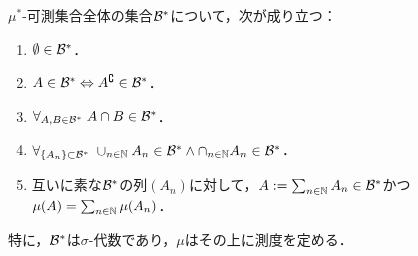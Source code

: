 \documentclass[uplatex, dvipdfmx]{jsreport}
\begin{document}
\begin{theorem}\label{thm-measure-from-outer-measure}
    $\mu^*$-可測集合全体の集合$\mathcal{B}^*$について，次が成り立つ：
    \begin{enumerate}
        \item $\emptyset\in\mathcal{B}^*$．
        \item $A\in\mathcal{B}^*\Leftrightarrow A^\complement\in\mathcal{B}^*$．
        \item $\forall_{A,B\in\mathcal{B}^*}\;A\cap B\in\mathcal{B}^*$．
        \item $\forall_{\{A_n\}\subset\mathcal{B}^*}\;\cup_{n\in\mathbb{N}}A_n\in\mathcal{B}^*\land\cap_{n\in\mathbb{N}}A_n\in\mathcal{B}^*$．
        \item 互いに素な$\mathcal{B}^*$の列$(A_n)$に対して，$A:=\sum_{n\in\mathbb{N}}A_n\in\mathcal{B}^*$かつ$\mu(A)=\sum_{n\in\mathbb{N}}\mu(A_n)$．
    \end{enumerate}
    特に，$\mathcal{B}^*$は$\sigma$-代数であり，$\mu$はその上に測度を定める．
\end{theorem}
\end{document}
